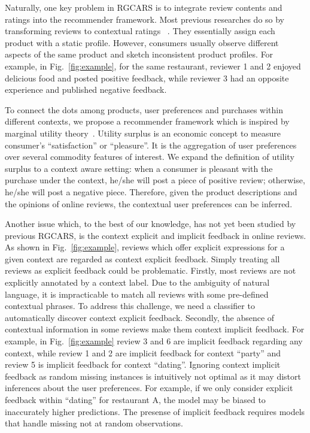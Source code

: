 \documentclass[preprint,12pt]{elsarticle}
\begin{document}
Naturally, one key problem in RGCARS is to integrate review contents and ratings into the recommender framework. Most previous researches do so by transforming reviews to contextual ratings ~\cite{Li2010Contextual,Liu2013Combining}. They essentially assign each product with a static profile. However, consumers usually observe different aspects of the same product and sketch inconsistent product profiles. For example, in Fig.~\ref{fig:example}, for the same restaurant, reviewer 1 and 2 enjoyed delicious food and posted positive feedback, while reviewer 3 had an opposite experience and published negative feedback. 


To connect the dots among products, user preferences and purchases within different contexts, we propose a recommender framework which is inspired by marginal utility theory~\cite{samuelson1937note}. Utility surplus is an economic concept to measure consumer's ``satisfaction'' or ``pleasure''. It is the aggregation of user preferences over several commodity features of interest. We expand the definition of utility surplus to a context aware setting: when a consumer is pleasant with the purchase under the context, he/she will post a piece of positive review; otherwise, he/she will post a negative piece. Therefore, given the product descriptions and the opinions of online reviews, the contextual user preferences can be inferred.   

Another issue which, to the best of our knowledge, has not yet been studied by previous RGCARS, is the context explicit and implicit feedback in online reviews. As shown in Fig.~\ref{fig:example}, reviews which offer explicit expressions for a given context are regarded as context explicit feedback. Simply treating all reviews as explicit feedback could be problematic. Firstly, most reviews are not explicitly annotated by a context label. Due to the ambiguity of natural language, it is impracticable to match all reviews with some pre-defined contextual phrases. To address this challenge, we need a classifier to automatically discover context explicit feedback. Secondly, the absence of contextual information in some reviews make them context implicit feedback.  For example, in Fig.~\ref{fig:example} review 3 and 6 are implicit feedback regarding any context, while review 1 and 2 are implicit feedback for context ``party'' and review 5 is implicit feedback for context ``dating''. Ignoring context implicit feedback as random missing instances is intuitively not optimal as it may distort inferences about the user preferences. For example, if we only consider explicit feedback within ``dating'' for restaurant A, the model may be biased to inaccurately higher predictions. The presense of implicit feedback requires models that handle missing not at random observations.    
\end{document}
